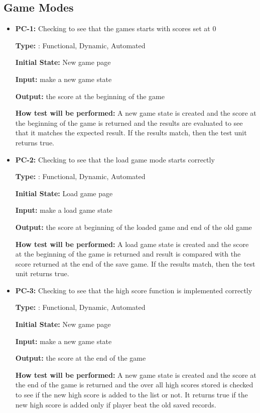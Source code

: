 \documentclass[12pt,letterpaper]{article}
\begin{document}
	\subsection{Game Modes}

\begin{reqbox}
	\begin{itemize}
	\item \textbf{PC-1: }Checking to see that the games starts with scores set at 0

	\textbf{Type: }: Functional, Dynamic, Automated

	\textbf{Initial State: } New game page

	\textbf{Input: } make a new game state
	
	\textbf{Output: }the score at the beginning of the game

	\textbf{How test will be performed: }A new game state is created and the score at the beginning of the game is returned and the results are evaluated to see that it matches the expected result. If the results match, then the test unit returns true.
	\end{itemize}
\end{reqbox}

\begin{reqbox}
	\begin{itemize}
	\item \textbf{PC-2: }Checking to see that the load game mode starts correctly

	\textbf{Type: }: Functional, Dynamic, Automated
	
	\textbf{Initial State: } Load game page
	
	\textbf{Input: } make a load game state
	
	\textbf{Output: }the score at beginning of the loaded game and end of the old game

	\textbf{How test will be performed: }A load game state is created and the score at the beginning of the game is returned and result is compared with the score returned at the end of the save game. If the results match, then the test unit returns true.
	\end{itemize}
\end{reqbox}

\begin{reqbox}
	\begin{itemize}
	\item \textbf{PC-3: }Checking to see that the high score function is implemented correctly

	\textbf{Type: }: Functional, Dynamic, Automated

	\textbf{Initial State: } New game page

	\textbf{Input: } make a new game state

	\textbf{Output: }the score at the end of the game

	\textbf{How test will be performed: }A new game state is created and the score at the end of the game is returned and the over all high scores stored is checked to see if the new high score is added to the list or not. It returns true if the new high score is added only if player beat the old saved records.	
	\end{itemize}
\end{reqbox}
\end{document}
